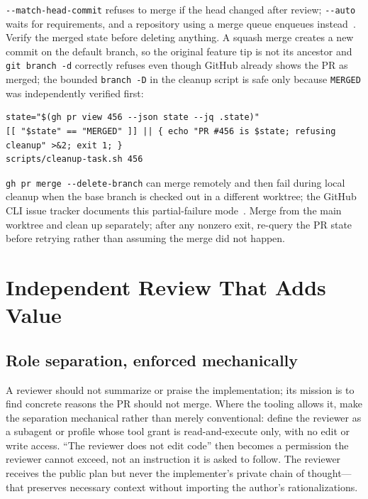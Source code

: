 \documentclass[11pt]{article}
\newcommand{\co}[1]{\lstinline[basicstyle=\ttfamily\color{gwInk}]{#1}}
\begin{document}
\co{--match-head-commit} refuses to merge if the head changed after review; \co{--auto} waits for
requirements, and a repository using a merge queue enqueues instead~\cite{github2026prmerge}.
Verify the merged state before deleting anything. A squash merge creates a new commit on the
default branch, so the original feature tip is not its ancestor and \co{git branch -d} correctly
refuses even though GitHub already shows the PR as merged; the bounded \co{branch -D} in the
cleanup script is safe only because \co{MERGED} was independently verified first:

\begin{lstlisting}[style=gw]
state="$(gh pr view 456 --json state --jq .state)"
[[ "$state" == "MERGED" ]] || { echo "PR #456 is $state; refusing cleanup" >&2; exit 1; }
scripts/cleanup-task.sh 456
\end{lstlisting}

\begin{caveat}
\co{gh pr merge --delete-branch} can merge remotely and then fail during local cleanup when the
base branch is checked out in a different worktree; the GitHub CLI issue tracker documents this
partial-failure mode~\cite{ghcli2026worktree}. Merge from the main worktree and clean up
separately; after any nonzero exit, re-query the PR state before retrying rather than assuming
the merge did not happen.
\end{caveat}

\section{Independent Review That Adds Value}

\subsection{Role separation, enforced mechanically}

A reviewer should not summarize or praise the implementation; its mission is to find concrete
reasons the PR should not merge. Where the tooling allows it, make the separation mechanical
rather than merely conventional: define the reviewer as a subagent or profile whose tool grant is
read-and-execute only, with no edit or write access. ``The reviewer does not edit code'' then
becomes a permission the reviewer cannot exceed, not an instruction it is asked to follow. The
reviewer receives the public plan but never the implementer's private chain of thought---that
preserves necessary context without importing the author's rationalizations.
\end{document}
